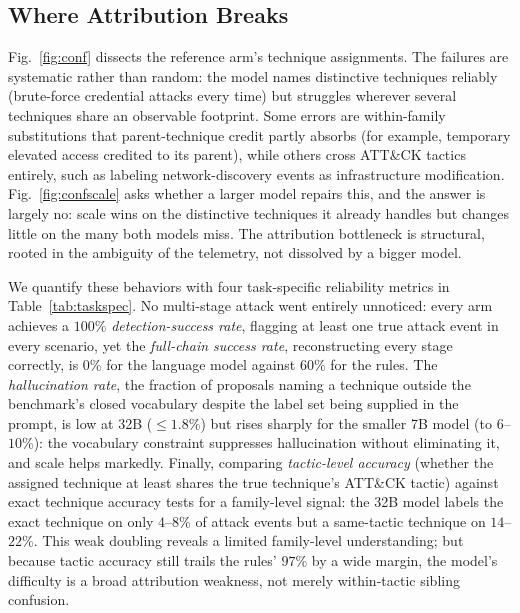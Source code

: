 \documentclass[journal]{IEEEtran}
\begin{document}
\subsection{Where Attribution Breaks}
Fig.~\ref{fig:conf} dissects the reference arm's technique assignments. The failures are systematic
rather than random: the model names distinctive techniques reliably (brute-force credential attacks
every time) but struggles wherever several techniques share an observable footprint. Some errors are
within-family substitutions that parent-technique credit partly absorbs (for example, temporary elevated
access credited to its parent), while others cross ATT\&CK tactics entirely, such as labeling
network-discovery events as infrastructure modification. Fig.~\ref{fig:confscale} asks whether a larger
model repairs this, and the answer is largely no: scale wins on the distinctive techniques it already
handles but changes little on the many both models miss. The attribution bottleneck is structural,
rooted in the ambiguity of the telemetry, not dissolved by a bigger model.

We quantify these behaviors with four task-specific reliability metrics in Table~\ref{tab:taskspec}. No
multi-stage attack went entirely unnoticed: every arm achieves a $100\%$ \emph{detection-success rate},
flagging at least one true attack event in every scenario, yet the \emph{full-chain success rate},
reconstructing every stage correctly, is $0\%$ for the language model against $60\%$ for the rules. The
\emph{hallucination rate}, the fraction of proposals naming a technique outside the benchmark's closed
vocabulary despite the label set being supplied in the prompt, is low at 32B ($\le 1.8\%$) but rises
sharply for the smaller 7B model (to $6$--$10\%$): the vocabulary constraint suppresses hallucination
without eliminating it, and scale helps markedly. Finally, comparing \emph{tactic-level
accuracy} (whether the assigned technique at least shares the true technique's ATT\&CK tactic) against
exact technique accuracy tests for a family-level signal: the 32B model labels the exact technique on
only $4$--$8\%$ of attack events but a same-tactic technique on $14$--$22\%$. This weak doubling reveals
a limited family-level understanding; but because tactic accuracy still trails the rules' $97\%$ by a
wide margin, the model's difficulty is a broad attribution weakness, not merely within-tactic sibling
confusion.
\end{document}

